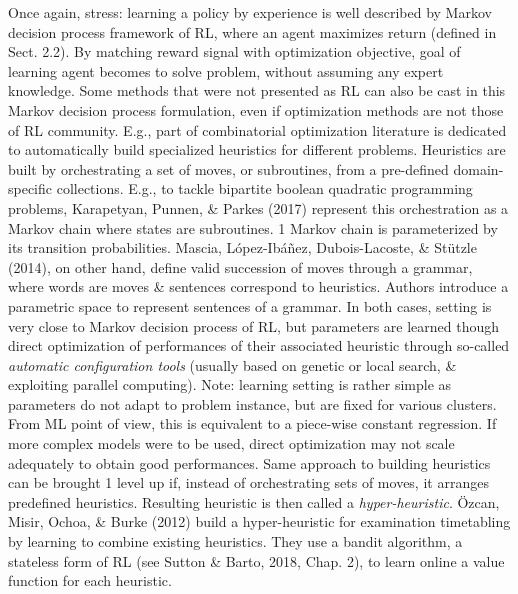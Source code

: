 \documentclass{article}
\begin{document}
\begin{itemize}
\begin{itemize}
\begin{itemize}
            Once again, stress: learning a policy by experience is well described by Markov decision process framework of RL, where an agent maximizes return (defined in Sect. 2.2). By matching reward signal with optimization objective, goal of learning agent becomes to solve problem, without assuming any expert knowledge. Some methods that were not presented as RL can also be  cast in this Markov decision process formulation, even if optimization methods are not those of RL community. E.g., part of combinatorial optimization literature is dedicated to automatically build specialized heuristics for different problems. Heuristics are built by orchestrating a set of moves, or subroutines, from a pre-defined domain-specific collections. E.g., to tackle bipartite boolean quadratic programming problems, Karapetyan, Punnen, \& Parkes (2017) represent this orchestration as a Markov chain where states are subroutines. 1 Markov chain is parameterized by its transition probabilities. Mascia, López-Ibáñez, Dubois-Lacoste, \& Stützle (2014), on other hand, define valid succession of moves through a grammar, where words are moves \& sentences correspond to heuristics. Authors introduce a parametric space to represent sentences of a grammar. In both cases, setting is very close to Markov decision process of RL, but parameters are learned though direct optimization of performances of their associated heuristic through so-called {\it automatic configuration tools} (usually based on genetic or local search, \& exploiting parallel computing). Note: learning setting is rather simple as parameters do not adapt to problem instance, but are fixed for various clusters. From ML point of view, this is equivalent to a piece-wise constant regression. If more complex models were to be used, direct optimization may not scale adequately to obtain good performances. Same approach to building heuristics can be brought 1 level up if, instead of orchestrating sets of moves, it arranges predefined heuristics. Resulting heuristic is then called a {\it hyper-heuristic}. Özcan, Misir, Ochoa, \& Burke (2012) build a hyper-heuristic for examination timetabling by learning to combine existing heuristics. They use a bandit algorithm, a stateless form of RL (see Sutton \& Barto, 2018, Chap. 2), to learn online a value function for each heuristic.


\end{itemize}
\end{itemize}
\end{itemize}
\end{document}
